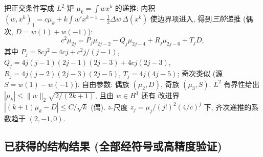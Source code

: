 \documentclass[UTF8]{ctexart}
\begin{document}
把正交条件写成 $L^2$-矩 $\mu_k = \int w x^k$ 的递推: 内积
$(w, x^k)_1 = c\mu_k + k\!\int w' x^{k-1} - \tfrac12 \Delta w\, \Delta(x^k)$
使边界项进入, 得到\emph{三阶}递推 (偶次, $D = w(1)+w(-1)$):
\begin{equation}
	c^2 \mu_{2j} = P_j \mu_{2j-2} - Q_j \mu_{2j-4} + R_j \mu_{2j-6} + T_j D,
\end{equation}
其中 $P_j = 8cj^2 - 4cj + c^2 j/(j-1)$, $Q_j = 4j(j-1)(2j-1)(2j-3)
+ 4cj(2j-3)$, $R_j = 4j(j-2)(2j-3)(2j-5)$, $T_j = 4j(4j-5)$; 奇次类似
(源 $S = w(1)-w(-1)$). 自由参数: 偶族 $(\mu_2, D)$, 奇族 $(\mu_3, S)$.
$L^2$ 有界性给出 $|\mu_k| \leq \|w\|_2 \sqrt{2/(2k+1)}$, 且由 $w \in H^1$ 还有
改进界 $|(k+1)\mu_k - D| \leq C/\sqrt{k}$ (偶). $z$-尺度
$z_j = \mu_j/(j!)^2 (4/c)^j$ 下, 齐次递推的系数趋于 $(2, -1, 0)$.

\subsection{已获得的结构结果 (全部经符号或高精度验证)}
\end{document}
